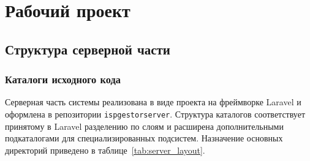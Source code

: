 \section{Рабочий проект}


\subsection{Структура серверной части}

\subsubsection{Каталоги исходного кода}

Серверная часть системы реализована в виде проекта на фреймворке Laravel и оформлена в репозитории \texttt{ispgestorserver}. Структура каталогов соответствует принятому в Laravel разделению по слоям и расширена дополнительными подкаталогами для специализированных подсистем. Назначение основных директорий приведено в таблице~\ref{tab:server_layout}.

